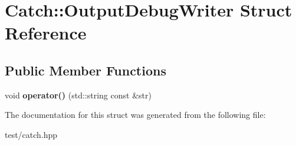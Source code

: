 \hypertarget{structCatch_1_1OutputDebugWriter}{}\section{Catch\+:\+:Output\+Debug\+Writer Struct Reference}
\label{structCatch_1_1OutputDebugWriter}
\subsection*{Public Member Functions}
\begin{DoxyCompactItemize}
\item 
void {\bfseries operator()} (std\+::string const \&str)\hypertarget{structCatch_1_1OutputDebugWriter_a6ed4872c2e7b9396dce5168039362c29}{}\label{structCatch_1_1OutputDebugWriter_a6ed4872c2e7b9396dce5168039362c29}

\end{DoxyCompactItemize}


The documentation for this struct was generated from the following file\+:\begin{DoxyCompactItemize}
\item 
test/catch.\+hpp\end{DoxyCompactItemize}
